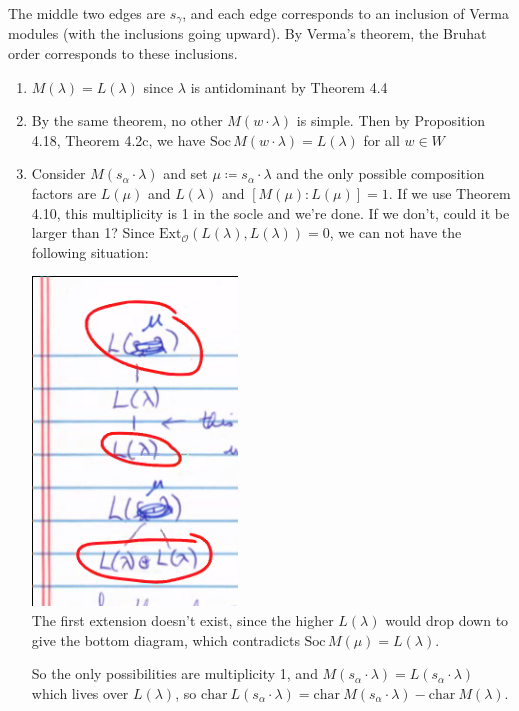\documentclass[11pt]{scrartcl}
\theoremstyle{definition}
\theoremstyle{theorem}
\theoremstyle{proof}
\theoremstyle{definition}
\theoremstyle{break}
\theoremstyle{problem}
\newcommand{\ch}[0]{\mathrm{char}~}
\newcommand{\ext}[0]{\text{Ext}}
\newcommand{\definedas}[0]{\coloneqq}
\newcommand{\OO}[0]{{\mathcal{O}}}
\newcommand{\soc}[0]{\mathrm{Soc}\,}
\begin{document}
The middle two edges are \(s_\gamma\), and each edge corresponds to an
inclusion of Verma modules (with the inclusions going upward). By
Verma's theorem, the Bruhat order corresponds to these inclusions.

\begin{enumerate}
\def\labelenumi{\arabic{enumi}.}
\item
  \(M(\lambda) = L(\lambda)\) since \(\lambda\) is antidominant by
  Theorem 4.4
\item
  By the same theorem, no other \(M(w\cdot \lambda)\) is simple. Then by
  Proposition 4.18, Theorem 4.2c, we have
  \(\soc M(w\cdot \lambda) = L(\lambda)\) for all \(w\in W\)
\item
  Consider \(M(s_\alpha \cdot \lambda)\) and set
  \(\mu \definedas s_\alpha \cdot \lambda\) and the only possible
  composition factors are \(L(\mu)\) and \(L(\lambda)\) and
  \([M(\mu): L(\mu) ] = 1\). If we use Theorem 4.10, this multiplicity
  is 1 in the socle and we're done. If we don't, could it be larger than
  1? Since \(\ext_\OO (L(\lambda), L(\lambda)) = 0\), we can not have
  the following situation:

  \includegraphics{figures/2020-04-01-09:36.png}\\

  The first extension doesn't exist, since the higher \(L(\lambda)\)
  would drop down to give the bottom diagram, which contradicts
  \(\soc M(\mu) = L(\lambda)\).

  So the only possibilities are multiplicity 1, and
  \(M(s_\alpha \cdot \lambda) = L(s_\alpha \cdot \lambda)\) which lives
  over \(L(\lambda)\), so
  \(\ch L(s_\alpha \cdot \lambda) = \ch M(s_\alpha \cdot \lambda) - \ch M(\lambda)\).


\end{enumerate}
\end{document}

